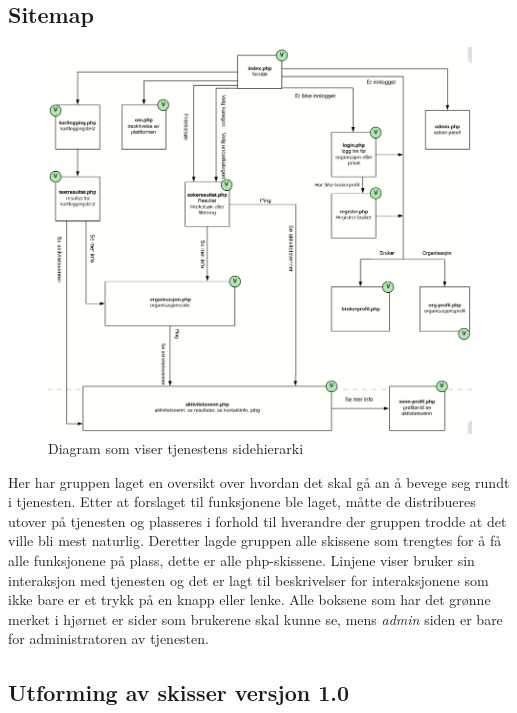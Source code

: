 \subsection{Sitemap}

\begin{figure}[H]
\includegraphics[width=\textwidth]{Illustrasjoner/trehierarki.png}
\caption{Diagram som viser tjenestens sidehierarki}
\label{fig:trehierarki}
\end{figure}

Her har gruppen laget en oversikt over hvordan det skal gå an å bevege seg rundt i tjenesten. Etter at forslaget til funksjonene ble laget, måtte de distribueres utover på tjenesten og plasseres i forhold til hverandre der gruppen trodde at det ville bli mest naturlig. Deretter lagde gruppen alle skissene som trengtes for å få alle funksjonene på plass, dette er alle php-skissene. Linjene viser bruker sin interaksjon med tjenesten og det er lagt til beskrivelser for interaksjonene som ikke bare er et trykk på en knapp eller lenke. Alle boksene som har det grønne merket i hjørnet er sider som brukerene skal kunne se, mens {\em admin} siden er bare for administratoren av tjenesten.



\subsection{Utforming av skisser versjon 1.0}
\label{section:utforming-1}

